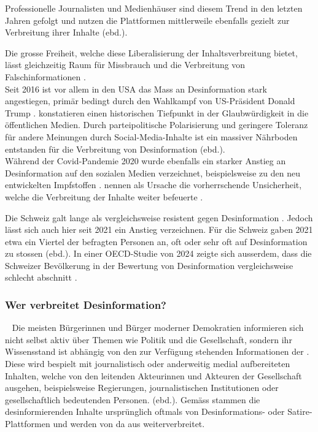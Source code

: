 \documentclass[12pt,a4paper]{article}        %
\begin{document}
\pagebreak
Professionelle Journalisten und Medienhäuser sind diesem Trend in den letzten Jahren gefolgt und nutzen die Plattformen mittlerweile ebenfalls gezielt zur Verbreitung ihrer Inhalte (ebd.).

Die grosse Freiheit, welche diese Liberalisierung der Inhaltsverbreitung bietet, lässt gleichzeitig Raum für Missbrauch und die Verbreitung von Falschinformationen \parencite[4]{ceron_fake_2021}.\\
Seit 2016 ist vor allem in den USA das Mass an Desinformation stark angestiegen, primär bedingt durch den Wahlkampf von US-Präsident Donald Trump \parencites[1094f]{lazer_science_2018}{allcott_social_2017}[147]{marx_fake_2020}[147]{tandoc_jr_defining_2018}. \textcite[1094f]{lazer_science_2018} konstatieren einen historischen Tiefpunkt in der Glaubwürdigkeit in die öffentlichen Medien. Durch parteipolitische Polarisierung und geringere Toleranz für andere Meinungen durch Social-Media-Inhalte ist ein massiver Nährboden entstanden für die Verbreitung von Desinformation (ebd.).\\
Während der Covid-Pandemie 2020 wurde ebenfalls ein starker Anstieg an Desinformation auf den sozialen Medien verzeichnet, beispielsweise zu den neu entwickelten Impfstoffen \parencite[2]{khan_fake_2021}. \Textcite[2]{ceron_fake_2021} nennen als Ursache die vorherrschende Unsicherheit, welche die Verbreitung der Inhalte weiter befeuerte \parencite[vgl.\ auch][22f]{zoglauer_konstruierte_2021}.

Die Schweiz galt lange als vergleichsweise resistent gegen Desinformation \parencite[26]{vogler_wahrnehmung_2021}. Jedoch lässt sich auch hier seit 2021 ein Anstieg verzeichnen. Für die Schweiz gaben 2021 etwa ein Viertel der befragten Personen an, oft oder sehr oft auf Desinformation zu stossen (ebd.). In einer OECD-Studie von 2024 zeigte sich ausserdem, dass die Schweizer Bevölkerung in der Bewertung von Desinformation vergleichsweise schlecht abschnitt \parencite{wyl_schweizerinnen_2024}.

\subsubsection{Wer verbreitet Desinformation?}
~\label{theory_disseminents}
Die meisten Bürgerinnen und Bürger moderner Demokratien informieren sich nicht selbst aktiv über Themen wie Politik und die Gesellschaft, sondern ihr Wissensstand ist abhängig von den zur Verfügung stehenden Informationen der  \parencite[69]{lecheler_disinformation_2022}. Diese wird bespielt mit journalistisch oder anderweitig medial aufbereiteten Inhalten, welche von den leitenden Akteurinnen und Akteuren der Gesellschaft ausgehen, beispielsweise Regierungen, journalistischen Institutionen oder gesellschaftlich bedeutenden Personen. (ebd.). Gemäss \textcite[217]{allcott_social_2017} stammen die desinformierenden Inhalte ursprünglich oftmals von Desinformations- oder Satire-Plattformen und werden von da aus weiterverbreitet.
\end{document}
